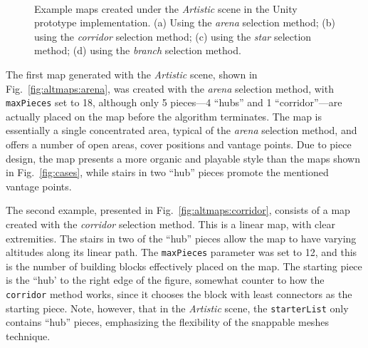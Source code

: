 \documentclass[journal]{IEEEtran}
\begin{document}
\begin{figure*}[!t]
    \centering

    \\

    \caption{Example maps created under the \textit{Artistic} scene in the Unity prototype
    implementation.
    (a) Using the \textit{arena} selection method;
    (b) using the \textit{corridor} selection method;
    (c) using the \textit{star} selection method;
    (d) using the \textit{branch} selection method.}

    \label{fig:altmaps}
\end{figure*}

The first map generated with the \textit{Artistic} scene, shown in Fig.~\ref{fig:altmaps:arena},
was created with the \textit{arena} selection method, with \texttt{maxPieces} set to 18, although
only 5 pieces---4 ``hubs'' and 1 ``corridor''---are actually placed on the map before the algorithm
terminates. The map is essentially a single concentrated area, typical of the \textit{arena}
selection method, and offers a number of open areas, cover positions and vantage points. Due to
piece design, the map presents a more organic and playable style than the maps shown in
Fig.~\ref{fig:cases}, while stairs in two ``hub'' pieces promote the mentioned vantage points.

The second example, presented in Fig.~\ref{fig:altmaps:corridor}, consists of a map created with the
\textit{corridor} selection method. This is a linear map, with clear extremities. The stairs in two
of the ``hub'' pieces allow the map to have varying altitudes along its linear path. The
\texttt{maxPieces} parameter was set to 12, and this is the number of building blocks effectively
placed on the map. The starting piece is the ``hub' to the right edge of the figure, somewhat counter
to how the \texttt{corridor} method works, since it chooses the block with least connectors as the
starting piece. Note, however, that in the \textit{Artistic} scene, the \texttt{starterList} only
contains ``hub'' pieces, emphasizing the flexibility of the snappable meshes technique.
\end{document}
